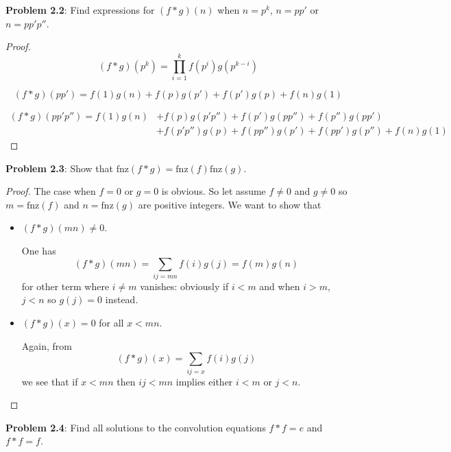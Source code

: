 \documentclass{article}
\newcommand{\fnz}{\text{fnz}}
\begin{document}
\textbf{Problem 2.2}: Find expressions for $(f*g)(n)$ when $n = p^k$, $n = pp'$ or $n = p p' p''$.

\begin{proof}
$$(f*g)(p^k) = \prod_{i=1}^{k} f(p^i) g(p^{k - i})$$

$$(f*g)(p p') = f(1) g(n) + f(p) g(p') + f(p') g(p) + f(n) g(1)$$

\begin{align*}
(f*g)(p p' p'') = f(1) g(n) &+ f(p) g(p' p'') + f(p') g(p p'') + f(p'') g(p p')\\
&+  f(p' p'') g(p)  + f(p p'') g(p')  +  f(p p') g(p'') + f(n) g(1)
\end{align*}
\end{proof}

\textbf{Problem 2.3}: Show that $\fnz(f * g) = \fnz(f) \fnz(g)$.

\begin{proof}

The case when $f = 0$ or $g = 0$ is obvious. So let assume $f \not= 0$ and $g \not= 0$ so $m = \fnz(f)$ and $n = \fnz(g)$ are positive integers. We want to show that
\begin{itemize}
\item $(f * g)(mn) \not= 0$.

One has
$$(f * g)(mn) = \sum_{ij = mn} f(i) g(j) = f(m) g(n)$$
for other term where $i \not= m$ vanishes: obviously if $i < m$ and when $i > m$, $j < n$ so $g(j) = 0$ instead.

\item $(f * g)(x) = 0$ for all $x < mn$.

Again, from
$$(f * g)(x) = \sum_{ij = x} f(i) g(j)$$
we see that if $x < mn$ then $ij < mn$ implies either $i < m$ or $j < n$.

\end{itemize}
\end{proof}

\textbf{Problem 2.4}: Find all solutions to the convolution equations $f * f = e$ and $f * f = f$.
\end{document}
